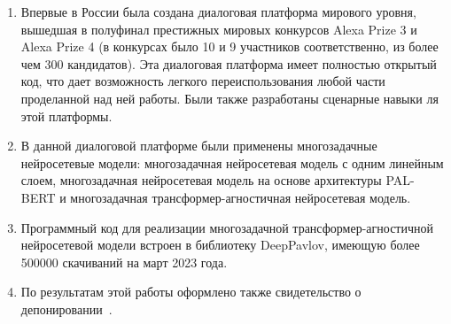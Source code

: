 \iffalse
Направления исследований 1.2.2:
1. Разработка новых математических методов моделирования объектов и
явлений (физико-математические науки).
2. Разработка, обоснование и тестирование эффективных вычислительных
методов с применением современных компьютерных технологий.
3. Реализация эффективных численных методов и алгоритмов в виде
комплексов проблемно-ориентированных программ для проведения
вычислительного эксперимента.
4. Разработка новых математических методов и алгоритмов интерпретации
натурного эксперимента на основе его математической модели.
5. Разработка новых математических методов и алгоритмов валидации
математических моделей объектов на основе данных натурного эксперимента
или на основе анализа математических моделей.
6. Разработка систем компьютерного и имитационного моделирования,
алгоритмов и методов имитационного моделирования на основе анализа
математических моделей (технические науки).
7. Качественные или аналитические методы исследования математических
моделей (технические науки).
8. Комплексные исследования научных и технических проблем с
применением современной технологии математического моделирования и
вычислительного эксперимента.
9. Постановка и проведение численных экспериментов, статистический
анализ их результатов, в том числе с применением современных
компьютерных технологий (технические науки).
\fi


{\influence}
\begin{enumerate}
    \item Впервые в России была создана диалоговая платформа мирового уровня, вышедшая в полуфинал престижных мировых конкурсов Alexa Prize 3 и Alexa Prize 4 (в конкурсах было 10 и 9 участников соответственно, из более чем 300 кандидатов). Эта диалоговая платформа имеет полностью открытый код, что дает возможность легкого переиспользования любой части проделанной над ней работы. Были также разработаны сценарные навыки ля этой платформы.
    \item В данной диалоговой платформе были применены многозадачные нейросетевые модели: многозадачная нейросетевая модель с одним линейным слоем, многозадачная нейросетевая модель на основе архитектуры PAL-BERT и многозадачная трансформер-агностичная нейросетевая модель. 
    \item Программный код для реализации многозадачной трансформер-агностичной нейросетевой модели встроен в библиотеку DeepPavlov, имеющую более 500000 скачиваний на март 2023 года.
    \item По результатам этой работы оформлено также свидетельство о депонировании~\cite{Дуплякин_Дмитрий_Ондар_Ушаков_2021}. %
\end{enumerate}

